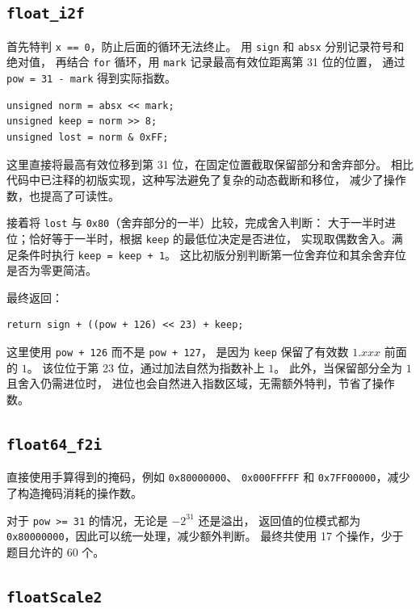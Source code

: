 \documentclass[UTF8,a4paper,11pt,fontset=fandol]{ctexart}
\begin{document}
\subsection{\texttt{float\_i2f}}

首先特判 \texttt{x == 0}，防止后面的循环无法终止。
用 \texttt{sign} 和 \texttt{absx} 分别记录符号和绝对值，
再结合 \texttt{for} 循环，用 \texttt{mark} 记录最高有效位距离第 31 位的位置，
通过 \texttt{pow = 31 - mark} 得到实际指数。

\begin{lstlisting}
unsigned norm = absx << mark;
unsigned keep = norm >> 8;
unsigned lost = norm & 0xFF;
\end{lstlisting}

这里直接将最高有效位移到第 31 位，在固定位置截取保留部分和舍弃部分。
相比代码中已注释的初版实现，这种写法避免了复杂的动态截断和移位，
减少了操作数，也提高了可读性。

接着将 \texttt{lost} 与 \texttt{0x80}（舍弃部分的一半）比较，完成舍入判断：
大于一半时进位；恰好等于一半时，根据 \texttt{keep} 的最低位决定是否进位，
实现取偶数舍入。满足条件时执行 \texttt{keep = keep + 1}。
这比初版分别判断第一位舍弃位和其余舍弃位是否为零更简洁。

最终返回：

\begin{lstlisting}
return sign + ((pow + 126) << 23) + keep;
\end{lstlisting}

这里使用 \texttt{pow + 126} 而不是 \texttt{pow + 127}，
是因为 \texttt{keep} 保留了有效数 $1.xxx$ 前面的 $1$。
该位位于第 23 位，通过加法自然为指数补上 $1$。
此外，当保留部分全为 $1$ 且舍入仍需进位时，
进位也会自然进入指数区域，无需额外特判，节省了操作数。

\subsection{\texttt{float64\_f2i}}

直接使用手算得到的掩码，例如 \texttt{0x80000000}、
\texttt{0x000FFFFF} 和 \texttt{0x7FF00000}，减少了构造掩码消耗的操作数。

对于 \texttt{pow >= 31} 的情况，无论是 $-2^{31}$ 还是溢出，
返回值的位模式都为 \texttt{0x80000000}，因此可以统一处理，减少额外判断。
最终共使用 17 个操作，少于题目允许的 60 个。

\subsection{\texttt{floatScale2}}
\end{document}
